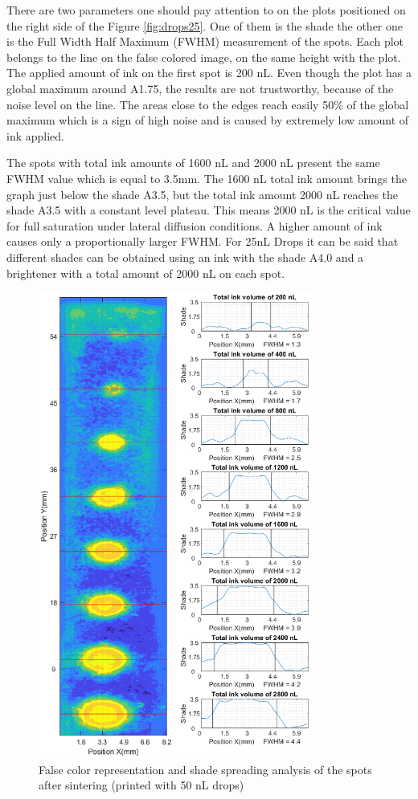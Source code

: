There are two parameters one should pay attention to on the plots positioned on the right side of the Figure \ref{fig:drops25}. One of them is the shade the other one is the Full Width Half Maximum (FWHM) measurement of the spots. Each plot belongs to the line on the false colored image, on the same height with the plot. The applied amount of ink on the first spot is 200 nL. Even though the plot has a global maximum around A1.75, the results are not trustworthy, because of the noise level on the line. The areas close to the edges reach easily 50\% of the global maximum which is a sign of high noise and is caused by extremely low amount of ink applied. 

The spots with total ink amounts of 1600 nL and 2000 nL present the same FWHM value which is equal to 3.5mm. The 1600 nL total ink amount brings the graph just below the shade A3.5, but the total ink amount 2000 nL reaches the shade A3.5 with a constant level plateau. This means 2000 nL is the critical value for full saturation under lateral diffusion conditions. A higher amount of ink causes only a proportionally larger FWHM. For 25nL Drops it can be said that different shades can be obtained using an ink with the shade A4.0 and a brightener with a total amount of 2000 nL on each spot.

\bigskip

\begin{figure}[H]
	\centering
	\includegraphics[width=0.8\textwidth]{grafiken/drops50.eps}
	\caption{False color representation and shade spreading analysis of the spots after sintering (printed with 50 nL drops)}
	\label{fig:drops50}
\end{figure} 

